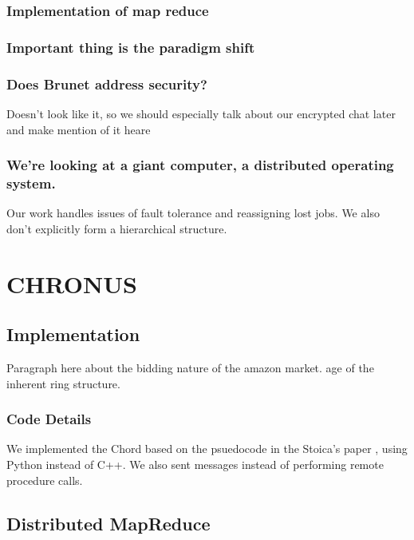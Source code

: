 \documentclass[conference, compsocconf, letterpaper]{IEEEtran}
\begin{document}
\subsubsection{Implementation of map reduce}

\subsubsection{Important thing is the paradigm shift}

\subsubsection{Does Brunet address security?}
Doesn't look like it, so we should especially talk about our encrypted chat later and make mention of it heare

\subsubsection{We're looking at a giant computer, a distributed operating system.}

Our work handles issues of fault tolerance and reassigning lost jobs.  We also don't explicitly form a hierarchical structure.









\section{CHRONUS}


\subsection{Implementation}
Paragraph here about the bidding nature of the amazon market.
age of the inherent ring structure.





\subsubsection{Code Details}
We implemented the Chord based on the psuedocode  in the Stoica's paper \cite{Chord}, using Python instead of C++.  We also sent messages instead of performing remote procedure calls.


\subsection{Distributed MapReduce}
\end{document}
